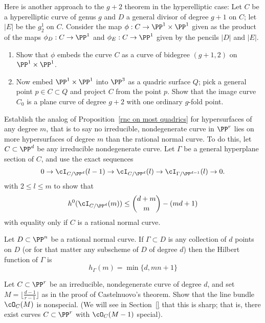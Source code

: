 \begin{exercise}
Here is another approach to the $g+2$ theorem in the hyperelliptic case: 
Let $C$ be a hyperelliptic curve of genus $g$ and $D$ a general divisor of degree $g+1$ on $C$; let $|E|$ be the $g^1_2$ on $C$.
Consider the map $\phi : C \to \PP^1 \times \PP^1$ given as the product of the maps $\phi_D : C \to \PP^1$ and $\phi_E : C \to \PP^1$ given by the pencils $|D|$ and $|E|$.
\begin{enumerate}
\item Show that $\phi$ embeds the curve $C$ as a curve of bidegree $(g+1,2)$ on $\PP^1 \times \PP^1$.
\item Now embed $\PP^1 \times \PP^1$ into $\PP^3$ as a quadric surface $Q$; pick a general point $p \in C \subset Q$ and project $C$ from the point $p$. Show that the image curve $C_0$ is a plane curve of degree $g+2$ with one ordinary $g$-fold point.
\end{enumerate}
\end{exercise}

\begin{exercise}\label{extremal m-ics}
Establish the analog of Proposition~\ref{rnc on most quadrics} for hypersurfaces of any degree $m$, that is to say no irreducible, nondegenerate curve in $\PP^r$ lies on more hypersurfaces of degree $m$ than the rational normal curve.
To do this, let $C\subset \PP^d$ be any irreducible nondegenerate curve. Let $\Gamma$ be a general hyperplane section
of $C$, and use the exact sequences
$$
0 \to \cI_{C/\PP^d}(l-1) \to \cI_{C/\PP^d}(l) \to \cI_{\Gamma/\PP^{d-1}}(l) \to 0.
$$ 
with $2 \leq l \leq m$ to show that
$$
h^0(\cI_{C/\PP^d}(m)) \leq  \binom{d+m}{m} - (md+1)
$$
with equality only if $C$ is a rational normal curve.
\end{exercise}

\begin{exercise}\label{linear bound is sharp}
Let $D \subset \PP^n$ be a rational normal curve. If $\Gamma \subset D$ is any collection of $d$ points on $D$ (or for that matter any subscheme of $D$ of degree $d$) then the Hilbert function of $\Gamma$ is
$$
h_\Gamma(m) = \min\{d, mn+1\}
$$
\end{exercise} 

\begin{exercise}
Let $C \subset \PP^r$ be an irreducible, nondegenerate curve of degree $d$, and set $M = \lfloor{\frac{d-1}{r-1}}\rfloor$ as in the proof of Castelnuovo's theorem.
Show that the line bundle $\cO_C(M)$ is nonspecial. (We will see in Section~\ref{} that this is sharp; that is, there exist curves $C \subset \PP^r$ with $\cO_C(M-1)$ special).
\end{exercise}

